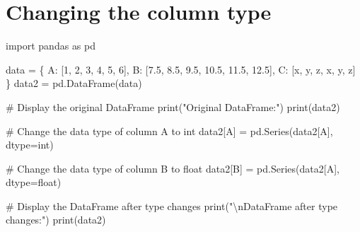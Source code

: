 \documentclass[
  english,
  letterpaper,
  DIV=11,
  numbers=noendperiod]{scrreprt}
\newenvironment{Shaded}{\begin{snugshade}}{\end{snugshade}}
\newcommand{\BuiltInTok}[1]{\textcolor[rgb]{0.00,0.23,0.31}{#1}}
\newcommand{\CharTok}[1]{\textcolor[rgb]{0.13,0.47,0.30}{#1}}
\newcommand{\CommentTok}[1]{\textcolor[rgb]{0.37,0.37,0.37}{#1}}
\newcommand{\ImportTok}[1]{\textcolor[rgb]{0.00,0.46,0.62}{#1}}
\newcommand{\NormalTok}[1]{\textcolor[rgb]{0.00,0.23,0.31}{#1}}
\newcommand{\OperatorTok}[1]{\textcolor[rgb]{0.37,0.37,0.37}{#1}}
\newcommand{\StringTok}[1]{\textcolor[rgb]{0.13,0.47,0.30}{#1}}
\begin{document}
\section{Changing the column type}\label{changing-the-column-type}

\begin{Shaded}
\begin{Highlighting}[]
\ImportTok{import}\NormalTok{ pandas }\ImportTok{as}\NormalTok{ pd}


\NormalTok{data }\OperatorTok{=}\NormalTok{ \{}
    \StringTok{\textquotesingle{}A\textquotesingle{}}\NormalTok{: [}\StringTok{\textquotesingle{}1\textquotesingle{}}\NormalTok{, }\StringTok{\textquotesingle{}2\textquotesingle{}}\NormalTok{, }\StringTok{\textquotesingle{}3\textquotesingle{}}\NormalTok{, }\StringTok{\textquotesingle{}4\textquotesingle{}}\NormalTok{, }\StringTok{\textquotesingle{}5\textquotesingle{}}\NormalTok{, }\StringTok{\textquotesingle{}6\textquotesingle{}}\NormalTok{],}
    \StringTok{\textquotesingle{}B\textquotesingle{}}\NormalTok{: [}\StringTok{\textquotesingle{}7.5\textquotesingle{}}\NormalTok{, }\StringTok{\textquotesingle{}8.5\textquotesingle{}}\NormalTok{, }\StringTok{\textquotesingle{}9.5\textquotesingle{}}\NormalTok{, }\StringTok{\textquotesingle{}10.5\textquotesingle{}}\NormalTok{, }\StringTok{\textquotesingle{}11.5\textquotesingle{}}\NormalTok{, }\StringTok{\textquotesingle{}12.5\textquotesingle{}}\NormalTok{],}
    \StringTok{\textquotesingle{}C\textquotesingle{}}\NormalTok{: [}\StringTok{\textquotesingle{}x\textquotesingle{}}\NormalTok{, }\StringTok{\textquotesingle{}y\textquotesingle{}}\NormalTok{, }\StringTok{\textquotesingle{}z\textquotesingle{}}\NormalTok{, }\StringTok{\textquotesingle{}x\textquotesingle{}}\NormalTok{, }\StringTok{\textquotesingle{}y\textquotesingle{}}\NormalTok{, }\StringTok{\textquotesingle{}z\textquotesingle{}}\NormalTok{]}
\NormalTok{\}}
\NormalTok{data2 }\OperatorTok{=}\NormalTok{ pd.DataFrame(data)}

\CommentTok{\# Display the original DataFrame}
\BuiltInTok{print}\NormalTok{(}\StringTok{"Original DataFrame:"}\NormalTok{)}
\BuiltInTok{print}\NormalTok{(data2)}

\CommentTok{\# Change the data type of column \textquotesingle{}A\textquotesingle{} to int}
\NormalTok{data2[}\StringTok{\textquotesingle{}A\textquotesingle{}}\NormalTok{] }\OperatorTok{=}\NormalTok{ pd.Series(data2[}\StringTok{\textquotesingle{}A\textquotesingle{}}\NormalTok{], dtype}\OperatorTok{=}\BuiltInTok{int}\NormalTok{)}

\CommentTok{\# Change the data type of column \textquotesingle{}B\textquotesingle{} to float}
\NormalTok{data2[}\StringTok{\textquotesingle{}B\textquotesingle{}}\NormalTok{] }\OperatorTok{=}\NormalTok{ pd.Series(data2[}\StringTok{\textquotesingle{}A\textquotesingle{}}\NormalTok{], dtype}\OperatorTok{=}\BuiltInTok{float}\NormalTok{)}

\CommentTok{\# Display the DataFrame after type changes}
\BuiltInTok{print}\NormalTok{(}\StringTok{"}\CharTok{\textbackslash{}n}\StringTok{DataFrame after type changes:"}\NormalTok{)}
\BuiltInTok{print}\NormalTok{(data2)}
\end{Highlighting}
\end{Shaded}
\end{document}
